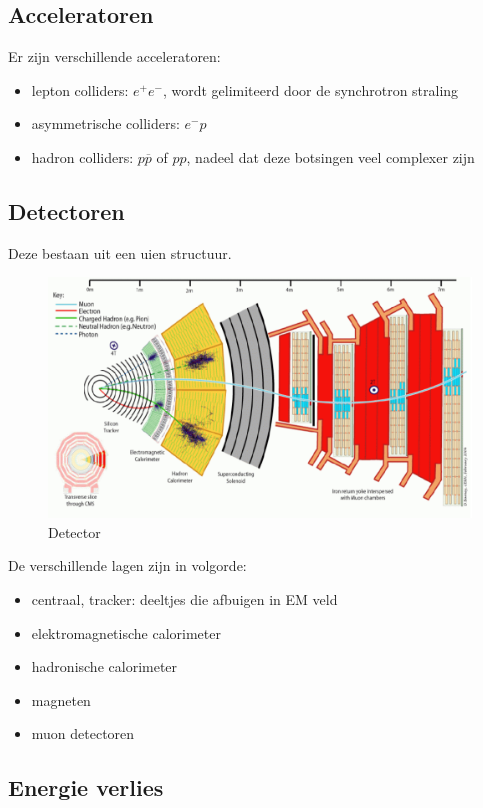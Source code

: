 \documentclass[../main.tex]{subfiles}
\begin{document}
\subsection{Acceleratoren}%
\label{sub:acceleratoren}

Er zijn verschillende acceleratoren: 
\begin{itemize}
    \item lepton colliders: $e^+e^-$, wordt gelimiteerd door de synchrotron straling
    \item asymmetrische colliders: $e^-p$
    \item hadron colliders: $p\overline p$ of $pp$, nadeel dat deze botsingen veel complexer zijn
\end{itemize}

\subsection{Detectoren}%
\label{sub:detectoren}

Deze bestaan uit een uien structuur.

\begin{figure}[h]
    \centering
    \includegraphics[width=0.8\linewidth]{introduction_and_review/detector.png}
    \caption{Detector}%
    \label{fig:detector}
\end{figure}

De verschillende lagen zijn in volgorde:
\begin{itemize}
    \item centraal, tracker: deeltjes die afbuigen in EM veld
    \item elektromagnetische calorimeter
    \item hadronische calorimeter
    \item magneten
    \item muon detectoren
\end{itemize}

\subsection{Energie verlies}%
\label{sub:energie_verlies}
\end{document}
